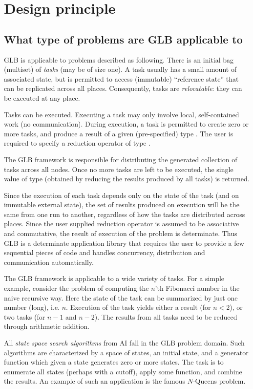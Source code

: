 \section{Design principle}

\subsection{What type of problems are GLB applicable to}
GLB is applicable to problems described as following. There is an initial
bag (multiset) of {\em tasks} (may be of size one). A task usually has a
small amount of associated state, but is permitted to access
(immutable) ``reference state''  that can be replicated across all
places. Consequently, tasks are {\em relocatable}: they can be
executed at any place. 

Tasks can be executed. Executing a task may only involve local,
self-contained work (no communication). During execution, a task is
permitted to create zero or more tasks, and produce a result of a given
(pre-specified) type . The user is required to specify a
reduction operator of type . 

The GLB framework is responsible for distributing the generated
collection of tasks across all nodes. Once no more tasks are left to
be executed, the single value of type  (obtained by reducing
the results produced by all tasks) is returned.  

Since the execution of each task depends only on the state of the
task (and on immutable external state), the set of results produced on
execution will be the same from one run to another, regardless of
how the tasks are distributed across places. Since the user supplied
reduction operator is assumed to be associative and commutative, the
result of execution of the problem is determinate. Thus GLB is a
determinate application library that requires the user to provide a
few sequential pieces of code and handles concurrency, distribution
and communication automatically. 

The GLB framework is applicable to a wide variety of tasks. For a
simple example, consider the problem of computing the $n$'th Fibonacci
number in the naive recursive way. Here the state of the task can be
summarized by just one number (long), i.e.{} $n$. Execution of the
task yields either a result (for $n < 2$), or two tasks (for $n-1$ and
$n-2$). The results from all tasks need to be reduced through
arithmetic addition. 

All {\em state space search algorithms} from AI fall in the GLB problem domain. Such algorithms are characterized by a space of states, an
initial state, and a generator function which given a state generates
zero or more states. The task is to enumerate all states (perhaps with
a cutoff), apply some function, and combine the results. An example of
such an application is the famous $N$-Queens problem.


